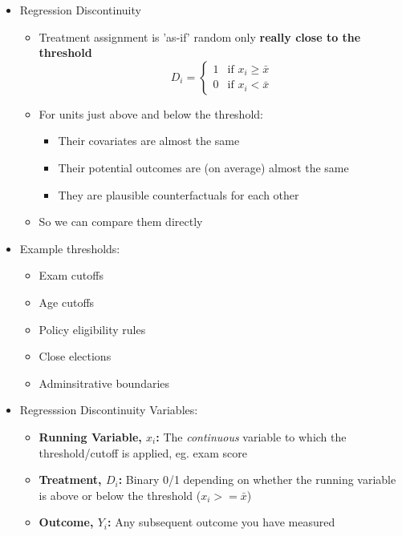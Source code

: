 \documentclass[xcolor=x11names,compress]{beamer}\usepackage[]{graphicx}\usepackage[]{color}
\renewcommand{\(}{\begin{columns}}
\renewcommand{\)}{\end{columns}}
\newcommand{\<}[1]{\begin{column}{#1}}
\renewcommand{\>}{\end{column}}
\begin{document}
\begin{frame}
\begin{itemize}
\item Regression Discontinuity
\begin{itemize}
\item Treatment assignment is 'as-if' random only \textbf{really close to the threshold}
\pause
\[
D_i=
\begin{cases}
1 & \text{if }x_i \geq \bar{x} \\
0 & \text{if }x_i < \bar{x}
\end{cases}
\]
\pause
\item For units just above and below the threshold:
\begin{itemize}
\item Their covariates are almost the same
\item Their potential outcomes are (on average) almost the same
\item They are plausible counterfactuals for each other
\end{itemize}
\pause
\item So we can compare them directly
\end{itemize}
\end{itemize}
\end{frame}

\begin{frame}
\begin{itemize}
\item Example thresholds:
\begin{itemize}
\item Exam cutoffs
\item Age cutoffs
\item Policy eligibility rules
\item Close elections
\item Adminsitrative boundaries
\end{itemize}
\end{itemize}
\end{frame}

\begin{frame}
\begin{itemize}
\item Regresssion Discontinuity Variables:
\begin{itemize}
\item \textbf{Running Variable, $x_i$:} The \textit{continuous} variable to which the threshold/cutoff is applied, eg. exam score
\pause
\item \textbf{Treatment, $D_i$:} Binary 0/1 depending on whether the running variable is above or below the threshold ($x_i>=\bar{x}$)
\pause
\item \textbf{Outcome, $Y_i$:} Any subsequent outcome you have measured
\end{itemize}
\end{itemize}
\end{frame}
\end{document}
